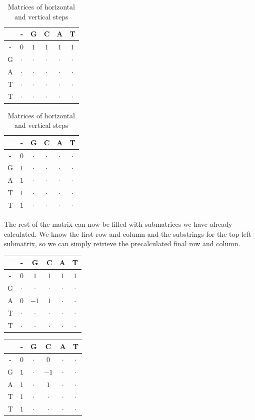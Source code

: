 \documentclass[times, utf8, seminar, numeric]{fer}
\begin{document}
\begin{table}[H]
\centering
\begin{tabular}{c|ccccc}
  & - & G & C & A & T\\
\hline
- & $0$ & $1$ & $1$ & $1$ & $1$ \\
G & $\cdot$ & $\cdot$ & $\cdot$ & $\cdot$ & $\cdot$ \\
A & $\cdot$ & $\cdot$ & $\cdot$ & $\cdot$ & $\cdot$ \\
T & $\cdot$ & $\cdot$ & $\cdot$ & $\cdot$ & $\cdot$ \\
T & $\cdot$ & $\cdot$ & $\cdot$ & $\cdot$ & $\cdot$ \\
\end{tabular}
\quad\quad
\begin{tabular}{c|ccccc}
  & - & G & C & A & T\\
\hline
- & $0$ & $\cdot$ & $\cdot$ & $\cdot$ & $\cdot$ \\
G & $1$ & $\cdot$ & $\cdot$ & $\cdot$ & $\cdot$ \\
A & $1$ & $\cdot$ & $\cdot$ & $\cdot$ & $\cdot$ \\
T & $1$ & $\cdot$ & $\cdot$ & $\cdot$ & $\cdot$ \\
T & $1$ & $\cdot$ & $\cdot$ & $\cdot$ & $\cdot$ \\
\end{tabular}
\caption{Matrices of horizontal and vertical steps}
\end{table}

The rest of the matrix can now be filled with submatrices we have already calculated. We know the first row and column and the substrings for the top-left submatrix, so we can simply retrieve the precalculated final row and column.

\begin{table}[H]
\centering
\begin{tabular}{c|ccccc}
  & - & G & C & A & T\\
\hline
- & $0$ & $1$ & $1$ & $1$ & $1$ \\
G & $\cdot$ & $\cdot$ & $\cdot$ & $\cdot$ & $\cdot$ \\
A & $0$ & $-1$ & $1$ & $\cdot$ & $\cdot$ \\
T & $\cdot$ & $\cdot$ & $\cdot$ & $\cdot$ & $\cdot$ \\
T & $\cdot$ & $\cdot$ & $\cdot$ & $\cdot$ & $\cdot$ \\
\end{tabular}
\quad\quad
\begin{tabular}{c|ccccc}
  & - & G & C & A & T\\
\hline
- & $0$ & $\cdot$ & $0$ & $\cdot$ & $\cdot$ \\
G & $1$ & $\cdot$ & $-1$ & $\cdot$ & $\cdot$ \\
A & $1$ & $\cdot$ & $1$ & $\cdot$ & $\cdot$ \\
T & $1$ & $\cdot$ & $\cdot$ & $\cdot$ & $\cdot$ \\
T & $1$ & $\cdot$ & $\cdot$ & $\cdot$ & $\cdot$ \\
\end{tabular}
\end{table}
\end{document}
